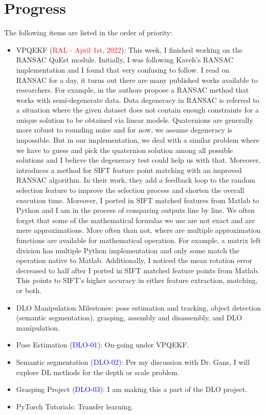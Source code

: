 \documentclass[11pt]{article}
\begin{document}
\section{Progress}
The following items are listed in the order of priority:
\begin{itemize}
    \item VPQEKF (\textcolor{red}{RAL - April 1st, 2022}): This week, I finished
    working on the RANSAC QuEst module. Initially, I was following Kaveh's
    RANSAC implementation and I found that very confusing to follow. I read on
    RANSAC for a day, it turns out there are many published works available to
    researchers. For example, in \cite{frahm2006ransac} the authors propose a
    RANSAC method that works with semi-degenerate data. Data degeneracy in
    RANSAC is referred to a situation where the given dataset does not contain
    enough constraints for a unique solution to be obtained via linear models.
    Quaternions are generally more robust to rounding noise and for now, we
    assume degeneracy is impossible. But in our implementation, we deal with
    a similar problem where we have to guess and pick the quaternion solution among
    all possible solutions and I believe the degeneracy test could help us
    with that. Moreover, \cite{shi2013sift} introduces a method for SIFT feature
    point matching with an improved RANSAC algorithm. In their work, they add a
    feedback loop to the random selection feature to improve the selection
    process and shorten the overall execution time. Moreover, I ported in
    SIFT matched features from Matlab to Python and I am in the process of
    comparing outputs line by line. We often forget that some of the
    mathematical formulas we use are not exact and are mere approximations.
    More often than not, where are multiple approximation functions are available
    for mathematical operation. For example, a matrix left division has multiple
    Python implementation and only some match the operation native to Matlab.
    Additionally, I noticed the mean rotation error decreased to half after I
    ported in SIFT matched feature points from Matlab. This points to SIFT's
    higher accuracy in either feature extraction, matching, or both.


    \item DLO Manipulation Milestones: pose estimation and tracking,
    object detection (semantic segmentation), grasping, assembly and
    disassembly, and DLO manipulation.
    \item Pose Estimation (\textcolor{blue}{DLO-01}): On-going under VPQEKF.
    \item Semantic segmentation (\textcolor{blue}{DLO-02}): Per my discussion with Dr. Gans, I
    will explore DL methods for the depth or scale problem.
    \item Grasping Project (\textcolor{blue}{DLO-03}): I am making this a part of the DLO project.
    \item PyTorch Tutorials: Transfer learning.

  \end{itemize}
\end{document}
